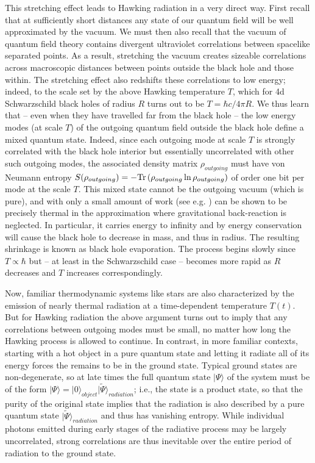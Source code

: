 \documentclass[12pt]{article}
\begin{document}
This stretching effect leads to Hawking radiation in a very direct way.  First recall that at sufficiently short distances any state of our quantum field will be well approximated by the vacuum.  We must then also recall that the vacuum of quantum field theory contains divergent ultraviolet correlations between spacelike separated points.  As a result, stretching the vacuum creates sizeable correlations across macroscopic distances between points outside the black hole and those within.  The stretching effect also redshifts these correlations to low energy; indeed, to the scale set by the above Hawking temperature $T$, which for 4d Schwarzschild black holes of radius $R$ turns out to be $T=\hbar c/4\pi R$.  We thus learn that -- even when they have travelled far from the black hole -- the low energy modes (at scale $T$) of the outgoing quantum field outside the black hole define a mixed quantum state.  Indeed, since each outgoing mode at scale $T$ is strongly correlated with the black hole interior but essentially uncorrelated with other such outgoing modes, the associated density matrix $\rho_{outgoing}$ must have von Neumann entropy $S(\rho_{outgoing}) = -{\rm Tr} \left( \rho_{outgoing} \ln \rho_{outgoing} \right)$ of order one bit per mode at the scale $T$. This mixed state cannot be the outgoing vacuum (which is pure), and with only a small amount of work (see e.g. \cite{Jacobson:2003vx}) can be shown to be precisely thermal in the approximation where gravitational back-reaction is neglected.    In particular, it carries energy to infinity and by energy conservation will cause the black hole to decrease in mass, and thus in radius.  The resulting shrinkage is known as black hole evaporation.  The process begins slowly since $T \propto \hbar$ but -- at least in the Schwarzschild case -- becomes more rapid as $R$ decreases and $T$ increases correspondingly.

Now, familiar thermodynamic systems like stars are also characterized by the emission of nearly thermal radiation at a time-dependent temperature $T(t)$.  But for Hawking radiation the above argument turns out to imply that any correlations between outgoing modes must be small, no matter how long the Hawking process is allowed to continue.  In contrast, in more familiar contexts, starting with a hot object in a pure quantum state and letting it radiate all of its energy forces the remains to be in the ground state.  Typical ground states are non-degenerate, so at late times the full quantum state $|\Psi\rangle$ of the system must be of the form $|\Psi\rangle = |0\rangle_{object} |\tilde \Psi\rangle_{radiation}$; i.e., the state is a product state, so that the purity of the original state implies that the radiation is also described by a pure quantum state $|\tilde \Psi\rangle_{radiation}$ and thus has vanishing entropy.  While individual photons emitted during early stages of the radiative process may be largely uncorrelated, strong correlations are thus inevitable over the entire period of radiation to the ground state.
\end{document}
